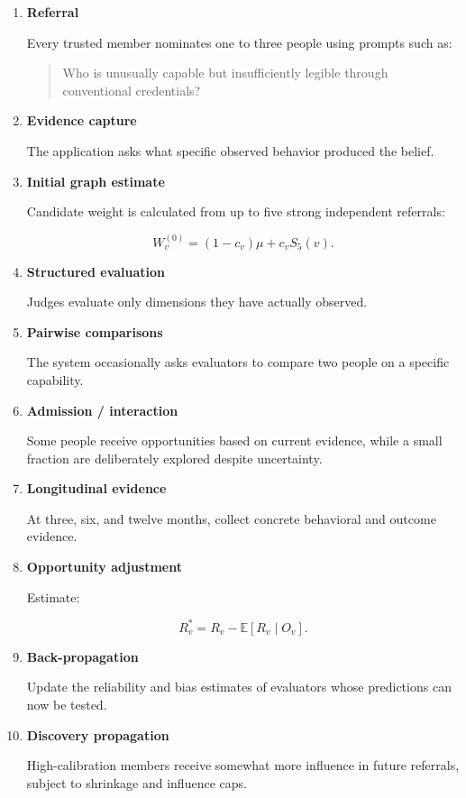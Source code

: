 \documentclass[11pt]{article}
\begin{document}
\begin{enumerate}[label=\textbf{Step \arabic*.}, leftmargin=2cm]

    \item \textbf{Referral}

    Every trusted member nominates one to three people using prompts such as:

    \begin{quote}
    Who is unusually capable but insufficiently legible through conventional
    credentials?
    \end{quote}

    \item \textbf{Evidence capture}

    The application asks what specific observed behavior produced the belief.

    \item \textbf{Initial graph estimate}

    Candidate weight is calculated from up to five strong independent referrals:

    \[
    W_v^{(0)}
    =
    (1-c_v)\mu+c_vS_5(v).
    \]

    \item \textbf{Structured evaluation}

    Judges evaluate only dimensions they have actually observed.

    \item \textbf{Pairwise comparisons}

    The system occasionally asks evaluators to compare two people on a specific
    capability.

    \item \textbf{Admission / interaction}

    Some people receive opportunities based on current evidence, while a small
    fraction are deliberately explored despite uncertainty.

    \item \textbf{Longitudinal evidence}

    At three, six, and twelve months, collect concrete behavioral and outcome
    evidence.

    \item \textbf{Opportunity adjustment}

    Estimate:

    \[
    R_v^\ast
    =
    R_v-\mathbb{E}[R_v\mid O_v].
    \]

    \item \textbf{Back-propagation}

    Update the reliability and bias estimates of evaluators whose predictions
    can now be tested.

    \item \textbf{Discovery propagation}

    High-calibration members receive somewhat more influence in future
    referrals, subject to shrinkage and influence caps.

\end{enumerate}
\end{document}
